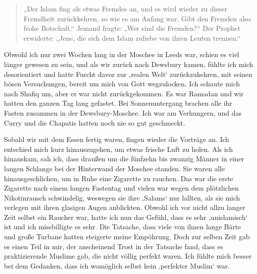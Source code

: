 \documentclass[12pt]{memoir}
\def\–{\hskip0pt-\hskip0pt}
\begin{document}
\begin{quote}
„Der Islam fing als etwas Fremdes an,
und es wird wieder zu dieser Fremdheit zurückkehren,
so wie es am Anfang war.
Gibt den Fremden also frohe Botschaft.“
Jemand fragte: „Wer sind die Fremden?“
Der Prophet erwiderte:
„Jene, die sich dem Islam zuliebe von ihren Leuten trennen.“
\end{quote}

Obwohl ich nur zwei Wochen lang in der Moschee in Leeds war,
schien es viel länger gewesen zu sein, und als wir zurück nach Dewsbury kamen,
fühlte ich mich desorientiert und hatte Furcht davor
zur ‚realen Welt‘ zurückzukehren, mit seinen bösen Versuchungen,
bereit um mich von Gott wegzulocken.
Ich schaute mich nach Shafiq um, aber er war nicht zurückgekommen.
Es war Ramadan und wir hatten den ganzen Tag lang gefastet.
Bei Sonnenuntergang brachen alle ihr Fasten zusammen in der Dewsbury\–Moschee.
Ich war am Verhungern, und das Curry
und die Chapatis hatten noch nie so gut geschmeckt.

Sobald wir mit dem Essen fertig waren, fingen wieder die Vorträge an.
Ich entschied mich kurz hinauszugehen, um etwas frische Luft zu holen.
Als ich hinauskam, sah ich, dass draußen um die fünfzehn bis zwanzig Männer
in einer langen Schlange bei der Hinterwand der Moschee standen.
Sie waren alle hinausgeschlichen, um in Ruhe eine Zigarette zu rauchen.
Das war die erste Zigarette nach einem langen Fastentag
und vielen war wegen dem plötzlichen Nikotinrausch schwindelig,
weswegen sie ihre ‚Salams‘ nur lallten,
als sie mich verlegen mit ihren glasigen Augen anblickten.
Obwohl ich vor nicht allzu langer Zeit selbst ein Raucher war,
hatte ich nun das Gefühl, dass es sehr ‚unislamisch‘ ist
und ich missbilligte es sehr.
Die Tatsache, dass viele von ihnen lange Bärte
und große Turbane hatten steigerte meine Empöhrung.
Doch zur selben Zeit gab es einen Teil in mir,
der anscheinend Trost in der Tatsache fand,
dass es praktizierende Muslime gab, die nicht völlig perfekt waren.
Ich fühlte mich besser bei dem Gedanken,
dass ich womöglich selbst kein ‚perfekter Muslim‘ war.
\end{document}
